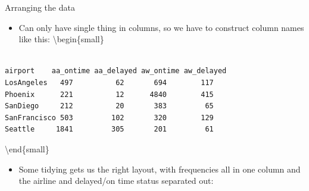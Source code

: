 \documentclass[ignorenonframetext,]{beamer}
\newenvironment{Shaded}{\begin{snugshade}}{\end{snugshade}}
\newcommand{\KeywordTok}[1]{\textcolor[rgb]{0.13,0.29,0.53}{\textbf{#1}}}
\newcommand{\NormalTok}[1]{#1}
\newcommand{\OperatorTok}[1]{\textcolor[rgb]{0.81,0.36,0.00}{\textbf{#1}}}
\newcommand{\StringTok}[1]{\textcolor[rgb]{0.31,0.60,0.02}{#1}}
\providecommand{\tightlist}{%
  \setlength{\itemsep}{0pt}\setlength{\parskip}{0pt}}
\begin{document}
\begin{frame}[fragile]{Arranging the data}
\protect\hypertarget{arranging-the-data}{}

\begin{itemize}
\tightlist
\item
  Can only have single thing in columns, so we have to construct column
  names like this: \textbackslash{}begin\{small\}
\end{itemize}

\begin{verbatim}

airport    aa_ontime aa_delayed aw_ontime aw_delayed
LosAngeles   497          62       694        117
Phoenix      221          12      4840        415
SanDiego     212          20       383         65
SanFrancisco 503         102       320        129
Seattle     1841         305       201         61
\end{verbatim}

\textbackslash{}end\{small\}

\begin{itemize}
\tightlist
\item
  Some tidying gets us the right layout, with frequencies all in one
  column and the airline and delayed/on time status separated out:
\end{itemize}

\begin{Shaded}
\end{Shaded}

\end{frame}
\end{document}
